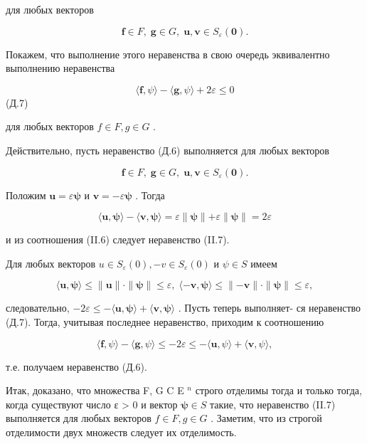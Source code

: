 \documentclass[8pt]{extarticle}
\begin{document}
для любых векторов

\[
\mathbf{f} \in  F,\;\mathbf{g} \in  G,\;\mathbf{u},\mathbf{v} \in  {S}_{\varepsilon }\left( \mathbf{0}\right) .
\]

Покажем, что выполнение этого неравенства в свою очередь эквивалентно выполнению неравенства

\[
\langle \mathbf{f},\psi \rangle  - \langle \mathbf{g},\psi \rangle  + {2\varepsilon } \leq  0
\]
 (Д.7)

для любых векторов \(f \in  F,g \in  G\) .

Действительно, пусть неравенство (Д.6) выполняется для любых векторов

\[
\mathbf{f} \in  F,\;\mathbf{g} \in  G,\;\mathbf{u},\mathbf{v} \in  {S}_{\varepsilon }\left( \mathbf{0}\right) .
\]

Положим \(\mathbf{u} = \varepsilon \mathbf{\psi }\) и \(\mathbf{v} =  - \varepsilon \mathbf{\psi }\) . Тогда

\[
\langle \mathbf{u},\mathbf{\psi }\rangle  - \langle \mathbf{v},\mathbf{\psi }\rangle  = \varepsilon \parallel \mathbf{\psi }\parallel  + \varepsilon \parallel \mathbf{\psi }\parallel  = {2\varepsilon }
\]

и из соотношения (II.6) следует неравенство (II.7).

Для любых векторов \(u \in  {S}_{\varepsilon }\left( 0\right) , - v \in  {S}_{\varepsilon }\left( 0\right)\) и \(\psi  \in  S\) имеем

\[
\langle \mathbf{u},\mathbf{\psi }\rangle  \leq  \parallel \mathbf{u}\parallel  \cdot  \parallel \mathbf{\psi }\parallel  \leq  \varepsilon ,\;\langle  - \mathbf{v},\mathbf{\psi }\rangle  \leq  \parallel  - \mathbf{v}\parallel  \cdot  \parallel \mathbf{\psi }\parallel  \leq  \varepsilon ,
\]

следовательно, \(- {2\varepsilon } \leq   - \langle \mathbf{u},\mathbf{\psi }\rangle  + \langle \mathbf{v},\mathbf{\psi }\rangle\) . Пусть теперь выполняет- ся неравенство (Д.7). Тогда, учитывая последнее неравенство, приходим к соотношению

\[
\langle \mathbf{f},\psi \rangle  - \langle \mathbf{g},\psi \rangle  \leq   - {2\varepsilon } \leq   - \langle \mathbf{u},\psi \rangle  + \langle \mathbf{v},\psi \rangle ,
\]

т.е. получаем неравенство (Д.6).

Итак, доказано, что множества F, G C E \({}^{n}\) строго отделимы тогда и только тогда, когда существуют число ε > 0 и вектор \(\mathbf{\psi } \in  S\) такие, что неравенство (II.7) выполняется для любых векторов \(f \in  F,g \in  G\) . Заметим, что из строгой отделимости двух множеств следует их отделимость.
\end{document}
